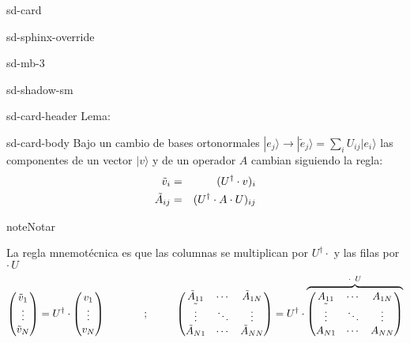 \documentclass[letterpaper,10pt,english]{jupyterBook}
\newcommand{\ket}[1]{|#1\rangle}
\begin{document}
\begin{sphinxuseclass}{sd-card}
\begin{sphinxuseclass}{sd-sphinx-override}
\begin{sphinxuseclass}{sd-mb-3}
\begin{sphinxuseclass}{sd-shadow-sm}
\begin{sphinxuseclass}{sd-card-header}
\sphinxAtStartPar
Lema:

\end{sphinxuseclass}
\begin{sphinxuseclass}{sd-card-body}
\sphinxAtStartPar
Bajo un cambio de bases ortonormales \( \ket{e_j} \to \ket{\tilde e_j} = \sum_{i}U_{ij} \ket{e_i}\) las componentes de un vector \(\ket{v}\) y de  un operador \(A\) cambian siguiendo la regla:
\begin{eqnarray*}
\tilde v_i &=& (U^\dagger \cdot v)_i \\ \rule{0mm}{12mm}
\tilde A_{ij} &=& (U^\dagger \cdot A \cdot U)_{ij}
\end{eqnarray*}
\end{sphinxuseclass}
\end{sphinxuseclass}
\end{sphinxuseclass}
\end{sphinxuseclass}
\end{sphinxuseclass}
\begin{sphinxadmonition}{note}{Notar}

\sphinxAtStartPar
La regla mnemotécnica es que las columnas se multiplican por \(U^\dagger\cdot\) y las filas por \(\cdot\, U\)
\begin{equation*}
\begin{split}
\begin{pmatrix} \tilde v_1 \\ \vdots \\ \tilde v_N \end{pmatrix} = 
U^\dagger \cdot \begin{pmatrix} v_1 \\ \vdots \\  v_N \end{pmatrix} ~~~~
~~~~~~~;~~~~~~~~
\begin{pmatrix} 
\tilde A_{11} & \cdots & \tilde A_{1N} \\
\tilde \vdots & \ddots & \vdots  \\
\tilde A_{N1} & \cdots & \tilde A_{NN} 
\end{pmatrix} 
 =  U^\dagger\cdot
 \overbrace{\begin{pmatrix} 
 A_{11} & \cdots &  A_{1N} \\
\tilde \vdots & \ddots & \vdots  \\
 A_{N1} & \cdots &  A_{NN} 
\end{pmatrix} }^{\large \cdot ~ U}
\end{split}
\end{equation*}\end{sphinxadmonition}
\end{document}
